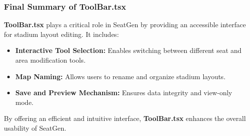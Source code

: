 \subsubsection{Final Summary of ToolBar.tsx}
\textbf{ToolBar.tsx} plays a critical role in SeatGen by providing an accessible interface for stadium layout editing. It includes:
\begin{itemize}
    \item \textbf{Interactive Tool Selection:} Enables switching between different seat and area modification tools.
    \item \textbf{Map Naming:} Allows users to rename and organize stadium layouts.
    \item \textbf{Save and Preview Mechanism:} Ensures data integrity and view-only mode.
\end{itemize}

By offering an efficient and intuitive interface, \textbf{ToolBar.tsx} enhances the overall usability of SeatGen.
